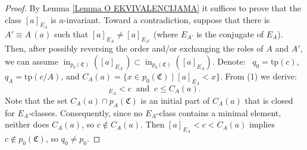 \documentclass[10pt,a4paper]{amsart}
\DeclareMathOperator{\supin}{in}
\def\strok{\restriction}
\newcommand{\Mon}{\mathfrak C}
\newcommand{\tp}{\mathrm{tp}}
\begin{document}
\begin{proof}
By Lemma \ref{Lemma O EKVIVALENCIJAMA} it suffices to prove that the class $[a]_{E_A}$ is $a$-invariant. Toward a contradiction, suppose that there is $A'\equiv A\,(a)$ such that $[a]_{E_A}\neq [a]_{E_{A'}}$ (where $E_{A'}$ is the conjugate of $E_A$). Then, after possibly reversing the order and/or exchanging the roles of $A$ and $A'$, we can assume $\supin_{p_0(\Mon)} ([a]_{E_{A'}})\subset\supin_{p_0(\Mon)} ([a]_{E_A})$. 
%
%
%
Denote: \ $q_0=\tp(c)$, $q_A=\tp(c/A)$,  and $C_A(a)=\{x\in p_0(\Mon)\mid [a]_{E_A}<x\}$.  From (1) we derive:
\begin{equation}
[a]_{E_A}<c \ \text{ and } \  c\leqslant C_A(a).
\end{equation}
Note that the set $C_A(a)\cap p_A(\Mon)$ is an initial part of $C_A(a)$ that is closed for $E_A$-classes. Consequently, since no $E_A$-class contains a minimal element, neither does $C_A(a)$, so $c\notin C_A(a)$. Then $[a]_{E_A}<c<C_A(a)$ implies $c\notin p_0(\Mon)$, so $q_0\neq p_0$.


\end{proof}
\end{document}
